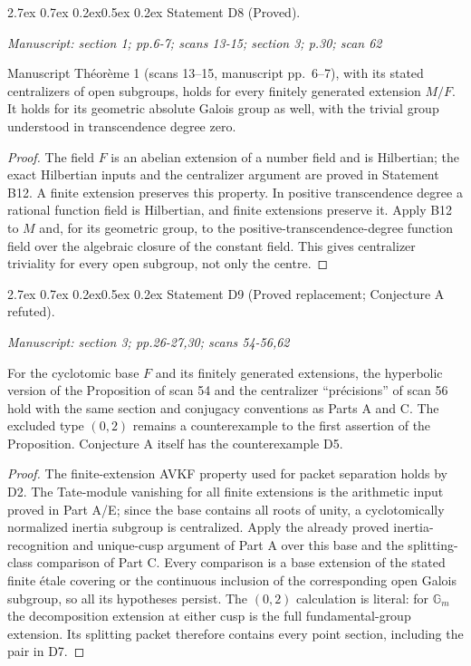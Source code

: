 \documentclass[11pt,a4paper]{article}
\makeatletter
\newcommand{\passage}[1]{\par\smallskip\noindent\textit{Manuscript: #1}\par\smallskip}
\renewcommand\paragraph{\@startsection{paragraph}{4}{\z@}%
  {2.7ex \@plus 0.7ex \@minus 0.2ex}{0.5ex \@plus 0.2ex}%
  {\normalfont\normalsize\bfseries}}
\makeatother
\begin{document}
\paragraph{Statement D8 (Proved).}\label{res:D8}
\passage{section 1; pp.6-7; scans 13-15; section 3; p.30; scan 62}

Manuscript Th\'eor\`eme 1 (scans 13--15, manuscript pp.~6--7), with its stated
centralizers of open subgroups, holds for every finitely generated
extension $M/F$.  It holds for its geometric absolute Galois group as
well, with the trivial group understood in transcendence degree zero.

\begin{proof}
The field $F$ is an abelian extension of a number field and is Hilbertian;
the exact Hilbertian inputs and the centralizer argument are proved in
Statement B12.  A finite extension preserves this property.  In positive
transcendence degree a rational function field is Hilbertian, and finite
extensions preserve it.  Apply B12 to $M$ and, for its geometric group,
to the positive-transcendence-degree function field over the algebraic
closure of the constant field.  This gives centralizer triviality for
every open subgroup, not only the centre.
\end{proof}

\paragraph{Statement D9 (Proved replacement; Conjecture A refuted).}\label{res:D9}
\passage{section 3; pp.26-27,30; scans 54-56,62}

For the cyclotomic base $F$ and its finitely generated extensions, the
hyperbolic version of the Proposition of scan 54 and the centralizer
``pr\'ecisions'' of scan 56 hold with the same section and conjugacy
conventions as Parts A and C.  The excluded type $(0,2)$ remains a
counterexample to the first assertion of the Proposition.  Conjecture A
itself has the counterexample D5.

\begin{proof}
The finite-extension AVKF property used for packet separation holds by
D2.  The Tate-module vanishing for all finite extensions is the
arithmetic input proved in Part A/E; since the base contains all roots
of unity, a cyclotomically normalized inertia subgroup is centralized.
Apply the already proved inertia-recognition and unique-cusp argument
of Part A over this base and the splitting-class comparison of Part C.
Every comparison is a base extension of the stated finite \'etale
covering or the continuous inclusion of the corresponding open Galois
subgroup, so all its hypotheses persist.  The $(0,2)$ calculation is
literal: for $\mathbb G_m$ the decomposition extension at either cusp
is the full fundamental-group extension.  Its splitting packet
therefore contains every point section, including the pair in D7.
\end{proof}
\end{document}
